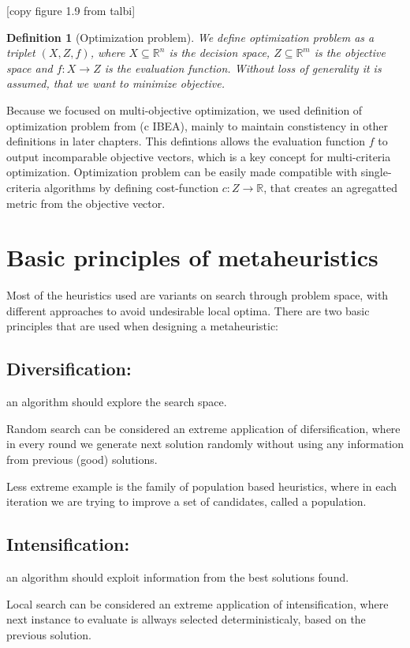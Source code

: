 \documentclass[12pt,oneside,draft]{fithesis2}
\newtheorem{defn}{Definition}
\begin{document}
[copy figure 1.9 from talbi]


\begin{defn}[Optimization problem]
We define optimization problem as a triplet $(X,Z,f)$,
 where $X \subseteq \mathbb{R}^n$ is the decision space,
$Z \subseteq \mathbb{R}^m$ is the objective space and $f:X \to Z$ is the evaluation function.
Without loss of generality it is assumed, that we want to minimize objective.
\end{defn}

Because we focused on multi-objective optimization, we used definition of optimization problem from (c IBEA), mainly to maintain constistency in other definitions in later chapters. This defintions allows the evaluation function $f$ to output incomparable objective vectors, which is a key concept for multi-criteria optimization. Optimization problem can be easily made compatible with single-criteria algorithms by defining cost-function $c:Z \to \mathbb{R}$, that creates an agregatted metric from the objective vector.

\section{Basic principles of metaheuristics}

Most of the heuristics used are variants on search through problem space, with different approaches to avoid undesirable local optima.
There are two basic principles that are used when designing a metaheuristic:

\subsection{Diversification:}
an algorithm should explore the search space.

Random search can be considered an extreme application of difersification, where in every round we generate next solution randomly without using any information from previous (good) solutions.

Less extreme example is the family of population based heuristics, where in each iteration we are trying to improve a set of candidates, called a population.

\subsection{Intensification:} an algorithm should exploit information from the best solutions found.

Local search can be considered an extreme application of intensification, where next instance to evaluate is allways selected deterministicaly, based on the previous solution.
\end{document}
